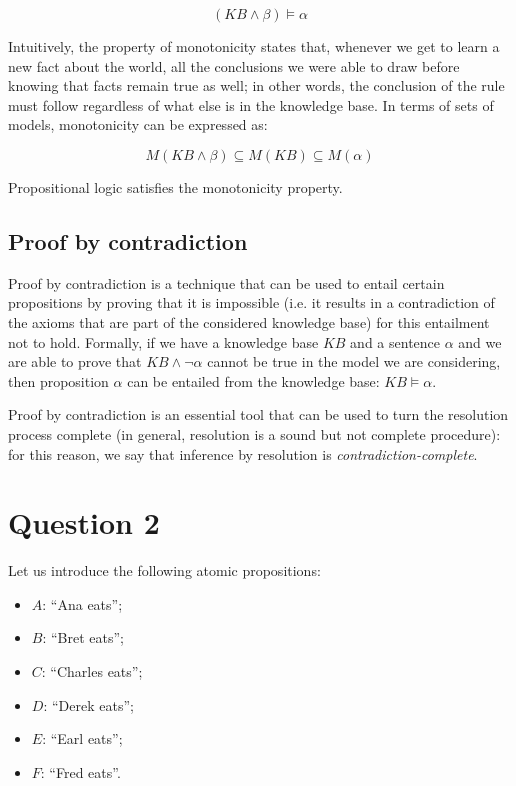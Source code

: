 \documentclass[letterpaper,headings=standardclasses]{scrartcl}
\begin{document}
$$ (KB \wedge \beta) \models \alpha $$

Intuitively, the property of monotonicity states that, whenever we get to learn a new fact about the world, all the conclusions we were able to draw before knowing that facts remain true as well; in other words, the conclusion of the rule must follow regardless of what else is in the knowledge base. In terms of sets of models, monotonicity can be expressed as:

$$ M(KB \wedge \beta) \subseteq M(KB) \subseteq M(\alpha) $$

Propositional logic satisfies the monotonicity property.

\subsection{Proof by contradiction}

Proof by contradiction is a technique that can be used to entail certain propositions by proving that it is impossible (i.e. it results in a contradiction of the axioms that are part of the considered knowledge base) for this entailment not to hold. Formally, if we have a knowledge base $KB$ and a sentence $\alpha$ and we are able to prove that $KB \wedge \neg \alpha$ cannot be true in the model we are considering, then proposition $\alpha$ can be entailed from the knowledge base: $KB \models \alpha$.

Proof by contradiction is an essential tool that can be used to turn the resolution process complete (in general, resolution is a sound but not complete procedure): for this reason, we say that inference by resolution is \emph{contradiction-complete}.

\section{Question 2}

Let us introduce the following atomic propositions:

\begin{itemize}
    \item $A$: ``Ana eats'';
    \item $B$: ``Bret eats'';
    \item $C$: ``Charles eats'';
    \item $D$: ``Derek eats'';
    \item $E$: ``Earl eats'';
    \item $F$: ``Fred eats''.
\end{itemize}
\end{document}
